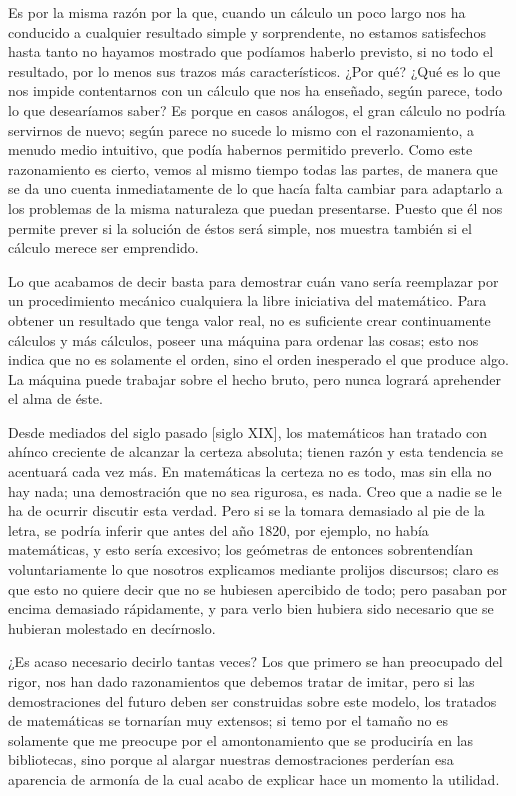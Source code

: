 \documentclass[a4paper, 12pt]{article}
\begin{document}

Es por la misma razón por la que, cuando un cálculo un poco largo
nos ha conducido a cualquier resultado simple y sorprendente, no estamos
satisfechos hasta tanto no hayamos mostrado que podíamos haberlo
previsto, si no todo el resultado, por lo menos sus trazos más característicos. ¿Por qué? ¿Qué es lo que nos impide contentarnos con
un cálculo que nos ha enseñado, según parece, todo lo que desearíamos saber? Es porque en casos análogos, el gran cálculo no
podría servirnos de nuevo; según parece no sucede lo mismo con el
razonamiento, a menudo medio intuitivo, que podía habernos permitido
preverlo. Como este razonamiento es cierto, vemos al mismo tiempo todas las
partes, de manera que se da uno cuenta inmediatamente de lo que hacía
falta cambiar para adaptarlo a los problemas de la misma naturaleza que
puedan presentarse. Puesto que él nos permite prever si la solución
de éstos será simple, nos muestra también si el cálculo
merece ser emprendido.

Lo que acabamos de decir basta para demostrar cuán vano sería
reemplazar por un procedimiento mecánico cualquiera la libre iniciativa
del matemático. Para obtener un resultado que tenga valor real, no es
suficiente crear continuamente cálculos y más cálculos, poseer
una máquina para ordenar las cosas; esto nos indica que no es solamente
el orden, sino el orden inesperado el que produce algo. La máquina puede
trabajar sobre el hecho bruto, pero nunca logrará aprehender el alma de 
éste.



Desde mediados del siglo pasado [siglo XIX], los matemáticos han tratado con ahínco creciente de alcanzar la certeza absoluta; tienen razón y esta
tendencia se acentuará cada vez más. En matemáticas la certeza
no es todo, mas sin ella no hay nada; una demostración que no sea rigurosa, es nada. Creo que a nadie se le ha
de ocurrir discutir esta verdad. Pero si se la tomara demasiado al pie de la
letra, se podría inferir que antes del año 1820, por ejemplo, no había matemáticas, y esto sería excesivo; los geómetras de
entonces sobrentendían voluntariamente lo que nosotros explicamos
mediante prolijos discursos; claro es que esto no quiere decir que no se
hubiesen apercibido de todo; pero pasaban por encima demasiado rápidamente, y para verlo bien hubiera sido necesario que se hubieran
molestado en decírnoslo.

¿Es acaso necesario decirlo tantas veces? Los que primero se han preocupado
del rigor, nos han dado razonamientos que debemos tratar de imitar, pero si
las demostraciones del futuro deben ser construidas sobre este modelo, los
tratados de matemáticas se tornarían muy extensos; si temo por el
tamaño no es solamente que me preocupe por el amontonamiento que se
produciría en las bibliotecas, sino porque al alargar nuestras
demostraciones perderían esa aparencia de armonía de la cual acabo
de explicar hace un momento la utilidad.
\end{document}
